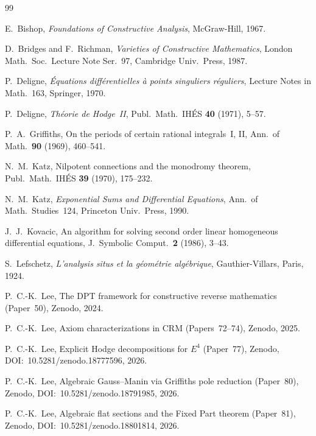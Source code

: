 \documentclass[11pt]{article}
\theoremstyle{plain}
\theoremstyle{definition}
\theoremstyle{remark}
\begin{document}

\begin{thebibliography}{99}

E.~Bishop, \emph{Foundations of Constructive Analysis}, McGraw-Hill, 1967.

D.~Bridges and F.~Richman, \emph{Varieties of Constructive Mathematics},
London Math.\ Soc.\ Lecture Note Ser.~97, Cambridge Univ.\ Press, 1987.

P.~Deligne, \emph{\'Equations diff\'erentielles \`a points singuliers r\'eguliers},
Lecture Notes in Math.~163, Springer, 1970.

P.~Deligne, \emph{Th\'eorie de Hodge~II}, Publ.\ Math.\ IH\'ES \textbf{40} (1971), 5--57.

P.~A.~Griffiths, On the periods of certain rational integrals~I, II,
Ann.\ of Math.~\textbf{90} (1969), 460--541.

N.~M.~Katz, Nilpotent connections and the monodromy theorem,
Publ.\ Math.\ IH\'ES \textbf{39} (1970), 175--232.

N.~M.~Katz, \emph{Exponential Sums and Differential Equations},
Ann.\ of Math.\ Studies~124, Princeton Univ.\ Press, 1990.

J.~J.~Kovacic, An algorithm for solving second order linear homogeneous
differential equations, J.~Symbolic Comput.~\textbf{2} (1986), 3--43.

S.~Lefschetz, \emph{L'analysis situs et la g\'eom\'etrie alg\'ebrique},
Gauthier-Villars, Paris, 1924.

P.~C.-K.~Lee, The DPT framework for constructive reverse mathematics (Paper~50),
Zenodo, 2024.

P.~C.-K.~Lee, Axiom characterizations in CRM (Papers~72--74),
Zenodo, 2025.

P.~C.-K.~Lee, Explicit Hodge decompositions for $E^4$ (Paper~77),
Zenodo, DOI:~10.5281/zenodo.18777596, 2026.

P.~C.-K.~Lee, Algebraic Gauss--Manin via Griffiths pole reduction (Paper~80),
Zenodo, DOI:~10.5281/zenodo.18791985, 2026.

P.~C.-K.~Lee, Algebraic flat sections and the Fixed Part theorem (Paper~81),
Zenodo, DOI:~10.5281/zenodo.18801814, 2026.


\end{thebibliography}
\end{document}
